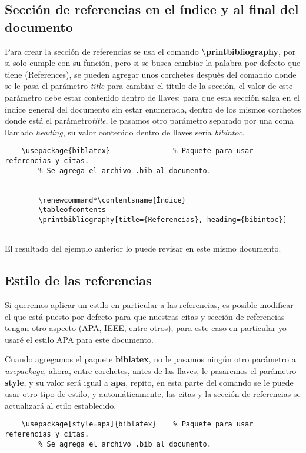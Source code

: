 \subsection{Sección de referencias en el índice y al final del documento}

Para crear la sección de referencias se usa el comando \textbf{\textbackslash{printbibliography}}, por si solo cumple con su función, pero si se busca cambiar la palabra por defecto que tiene (References), se pueden agregar unos corchetes después del comando donde se le pasa el parámetro \textit{title} para cambiar el título de la sección, el valor de este parámetro debe estar contenido dentro de llaves; para que esta sección salga en el índice general del documento sin estar enumerada, dentro de los mismos corchetes donde está el parámetro\textit{title}, le pasamos otro parámetro separado por una coma llamado \textit{heading}, su valor contenido dentro de llaves sería \textit{bibintoc}.
\begin{lstlisting}
    \usepackage{biblatex}	            % Paquete para usar referencias y citas.
    	% Se agrega el archivo .bib al documento.

    
        \renewcommand*\contentsname{Índice}
        \tableofcontents
        \printbibliography[title={Referencias}, heading={bibintoc}]
    
\end{lstlisting}

El resultado del ejemplo anterior lo puede revisar en este mismo documento.


\subsection{Estilo de las referencias}

Si queremos aplicar un estilo en particular a las referencias, es posible modificar el que está puesto por defecto para que nuestras citas y sección de referencias tengan otro aspecto (APA, IEEE, entre otros); para este caso en particular yo usaré el estilo APA para este documento.

Cuando agregamos el paquete \textbf{biblatex}, no le pasamos ningún otro parámetro a \textit{usepackage}, ahora, entre corchetes, antes de las llaves, le pasaremos el parámetro \textbf{style}, y su valor será igual a \textbf{apa}, repito, en esta parte del comando se le puede usar otro tipo de estilo, y automáticamente, las citas y la sección de referencias se actualizará al etilo establecido.
\begin{lstlisting}
    \usepackage[style=apa]{biblatex}    % Paquete para usar referencias y citas.
    	% Se agrega el archivo .bib al documento.

    
        
    
\end{lstlisting}
